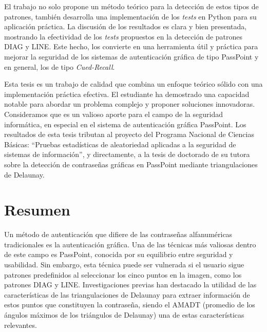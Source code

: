\documentclass[12pt]{report}
\begin{document}
El trabajo no solo propone un método teórico para la detección de estos tipos de patrones, también desarrolla una implementación de los \textit{tests} en Python para su aplicación práctica. La discusión de los resultados es clara y bien presentada, mostrando la efectividad de los \textit{tests} propuestos en la detección de patrones DIAG y LINE. Este hecho, los convierte en una herramienta útil y práctica para mejorar la seguridad de los sistemas de autenticación gráfica de tipo PassPoint y en general, los de tipo\textit{ Cued-Recall}.

Esta tesis es un trabajo de calidad que combina un enfoque teórico sólido con una implementación práctica efectiva. El estudiante ha demostrado una capacidad notable para abordar un problema complejo y proponer soluciones innovadoras. Consideramos que es un valioso aporte para el campo de la seguridad informática, en especial en el sistema de autenticación gráfica PassPoint. Los resultados de esta tesis tributan al proyecto del Programa Nacional de Ciencias Básicas: “Pruebas estadísticas de aleatoriedad aplicadas a la seguridad de sistemas de información”, y directamente, a la tesis de doctorado de su tutora sobre la detección de contraseñas gráficas en PassPoint mediante triangulaciones de Delaunay.

\chapter*{Resumen}
\hypertarget{Resumen}{}

	Un método de autenticación que difiere de las contraseñas alfanuméricas tradicionales es la autenticación gráfica. Una de las técnicas más valiosas dentro de este campo es PassPoint, conocida por su equilibrio entre seguridad y usabilidad. Sin embargo, esta técnica puede ser vulnerada si el usuario sigue patrones predefinidos al seleccionar los cinco puntos en la imagen, como los patrones DIAG y LINE. Investigaciones previas han destacado la utilidad de las características de las triangulaciones de Delaunay para extraer información de estos puntos que constituyen la contraseña, siendo el AMADT (promedio de los ángulos máximos de los triángulos de Delaunay) una de estas características relevantes.
	
\end{document}
